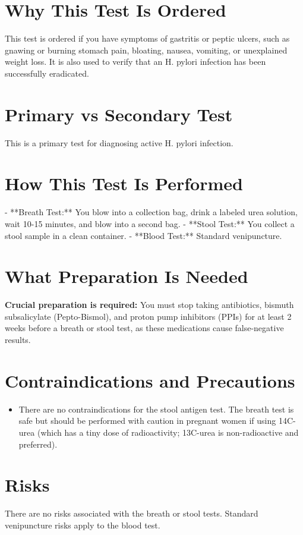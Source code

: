 \section*{Why This Test Is Ordered}
This test is ordered if you have symptoms of gastritis or peptic ulcers, such as gnawing or burning stomach pain, bloating, nausea, vomiting, or unexplained weight loss. It is also used to verify that an H. pylori infection has been successfully eradicated.

\section*{Primary vs Secondary Test}
This is a primary test for diagnosing active H. pylori infection.

\section*{How This Test Is Performed}
- **Breath Test:** You blow into a collection bag, drink a labeled urea solution, wait 10-15 minutes, and blow into a second bag.
- **Stool Test:** You collect a stool sample in a clean container.
- **Blood Test:** Standard venipuncture.

\section*{What Preparation Is Needed}
\textbf{Crucial preparation is required:} You must stop taking antibiotics, bismuth subsalicylate (Pepto-Bismol), and proton pump inhibitors (PPIs) for at least 2 weeks before a breath or stool test, as these medications cause false-negative results.

\section*{Contraindications and Precautions}
\begin{itemize}
  \item There are no contraindications for the stool antigen test. The breath test is safe but should be performed with caution in pregnant women if using 14C-urea (which has a tiny dose of radioactivity; 13C-urea is non-radioactive and preferred).
\end{itemize}
\section*{Risks}
There are no risks associated with the breath or stool tests. Standard venipuncture risks apply to the blood test.

